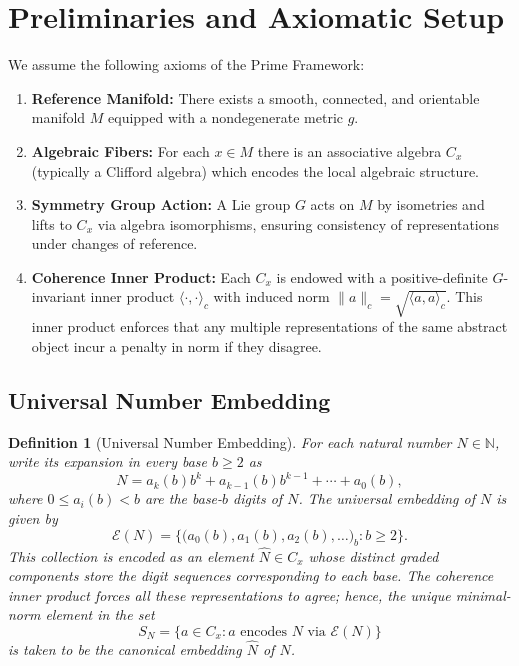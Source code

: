 \documentclass{article}
\newtheorem{definition}[theorem]{Definition}
\begin{document}
\section{Preliminaries and Axiomatic Setup}
We assume the following axioms of the Prime Framework:
\begin{enumerate}
    \item \textbf{Reference Manifold:} There exists a smooth, connected, and orientable manifold \(M\) equipped with a nondegenerate metric \(g\).
    \item \textbf{Algebraic Fibers:} For each \(x\in M\) there is an associative algebra \(C_x\) (typically a Clifford algebra) which encodes the local algebraic structure.
    \item \textbf{Symmetry Group Action:} A Lie group \(G\) acts on \(M\) by isometries and lifts to \(C_x\) via algebra isomorphisms, ensuring consistency of representations under changes of reference.
    \item \textbf{Coherence Inner Product:} Each \(C_x\) is endowed with a positive-definite \(G\)-invariant inner product \(\langle \cdot,\cdot \rangle_c\) with induced norm \(\|a\|_c=\sqrt{\langle a,a\rangle_c}\). This inner product enforces that any multiple representations of the same abstract object incur a penalty in norm if they disagree.
\end{enumerate}

\subsection{Universal Number Embedding}
\begin{definition}[Universal Number Embedding]
  For each natural number \(N\in\mathbb{N}\), write its expansion in every base \(b\ge2\) as
  \[
    N = a_k(b)b^k + a_{k-1}(b)b^{k-1} + \cdots + a_0(b),
  \]
  where \(0\le a_i(b) < b\) are the base-\(b\) digits of \(N\). The \emph{universal embedding} of \(N\) is given by
  \[
    \mathcal{E}(N) = \Big\{ \big(a_0(b), a_1(b), a_2(b), \dots\big)_b : b\ge2 \Big\}.
  \]
  This collection is encoded as an element \(\widehat{N}\in C_x\) whose distinct graded components store the digit sequences corresponding to each base. The coherence inner product forces all these representations to agree; hence, the unique minimal-norm element in the set 
  \[
    S_N = \{ a\in C_x : a \text{ encodes } N \text{ via } \mathcal{E}(N) \}
  \]
  is taken to be the canonical embedding \(\widehat{N}\) of \(N\).
\end{definition}
\end{document}
